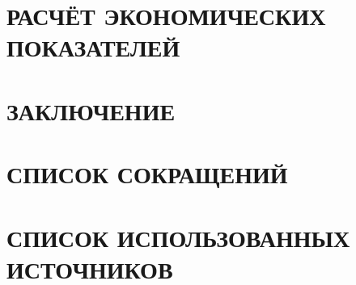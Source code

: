 \newpage
\section{РАСЧЁТ ЭКОНОМИЧЕСКИХ ПОКАЗАТЕЛЕЙ}


\newpage
{}
{}
\section*{ЗАКЛЮЧЕНИЕ}


\newpage
{}
{}
\section*{СПИСОК СОКРАЩЕНИЙ}


\newpage
{}
{}
\section*{СПИСОК ИСПОЛЬЗОВАННЫХ ИСТОЧНИКОВ}


